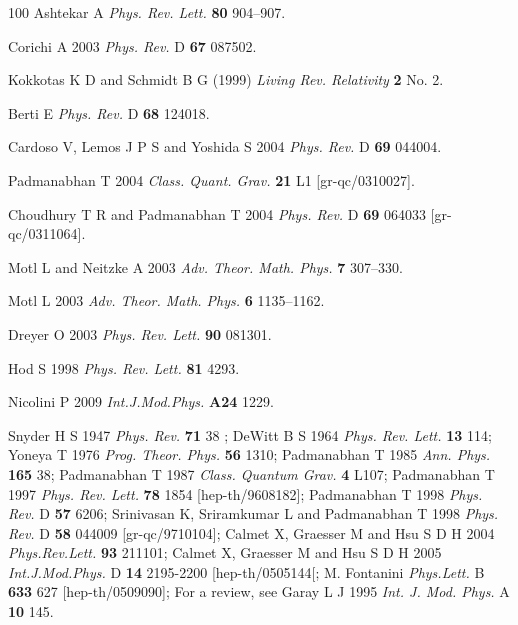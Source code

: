 \documentclass[12pt]{iopart}
\begin{document}
\begin{thebibliography}{100}
Ashtekar  A  \textit{Phys. Rev. Lett.} \textbf{80}  904--907.

Corichi A 2003  \textit{Phys. Rev.} D \textbf{67}  087502.

Kokkotas K D and  Schmidt  B G (1999)  \textit{Living Rev. Relativity} \textbf{2} No. 2.

Berti E  \textit{Phys. Rev.} D \textbf{68} 124018.

Cardoso V, Lemos J P S and  Yoshida S 2004  \textit{Phys. Rev.} D \textbf{69}  044004.

Padmanabhan T 2004 \textit{Class. Quant. Grav.} \textbf{21}  L1 [gr-qc/0310027].

Choudhury T R and Padmanabhan T 2004 \textit{Phys.  Rev.} D \textbf{69}  064033  [gr-qc/0311064].

Motl L and Neitzke  A 2003 \textit{Adv. Theor.  Math. Phys.} \textbf{7}  307--330.

Motl L 2003 \textit{Adv. Theor. Math. Phys.} \textbf{6}  1135--1162.

Dreyer O 2003 \textit{Phys.  Rev. Lett.} \textbf{90}  081301.

Hod S  1998 \textit{Phys. Rev. Lett.} \textbf{81}  4293.
  
Nicolini P  2009 \textit{Int.J.Mod.Phys.} \textbf{A24} 1229.
 
Snyder H S 1947 \textit{Phys. Rev.} \textbf{71} 38 ;
DeWitt B S  1964 \textit{ Phys. Rev. Lett.} \textbf{13} 114;
Yoneya T  1976 \textit{Prog. Theor. Phys.} \textbf{56} 1310;
Padmanabhan T  1985 \textit{ Ann. Phys.}  \textbf{165} 38; 
Padmanabhan T  1987  \textit{Class. Quantum Grav.} \textbf{4} L107;
Padmanabhan T 1997  \textit{Phys. Rev. Lett.} \textbf{78}  1854 [hep-th/9608182];
 Padmanabhan T 1998  \textit{Phys. Rev.} D \textbf{57} 6206; 
Srinivasan K,  Sriramkumar L and   Padmanabhan T 1998  \textit{Phys. Rev.} D \textbf{58} 044009  [gr-qc/9710104]; 
Calmet X,   Graesser M  and Hsu S D H 2004  \textit{Phys.Rev.Lett.} \textbf{93} 211101;
Calmet X,   Graesser M  and Hsu S D H 2005 \textit{Int.J.Mod.Phys.} D
             \textbf{14}  2195-2200 [hep-th/0505144[;
M. Fontanini  \textit{Phys.Lett.} B \textbf{633} 627   [hep-th/0509090];
For a review, see Garay L J  1995 \textit{ Int. J. Mod. Phys.} A \textbf{10} 145. 


\end{thebibliography}
\end{document}
